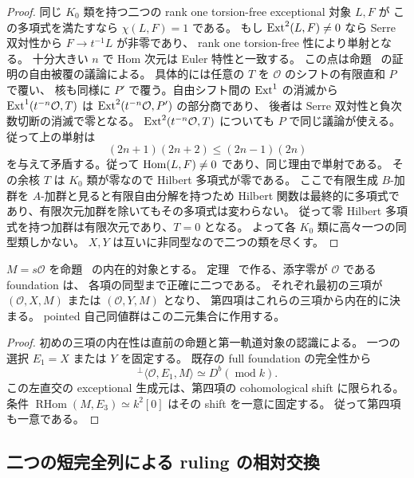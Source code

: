 \begin{proof}
同じ $K_0$ 類を持つ二つの rank one torsion-free exceptional 対象 $L,F$ が
この多項式を満たすなら $\chi(L,F)=1$ である。
もし $\operatorname{Ext}^2(L,F)\ne0$ なら Serre 双対性から $F\to t^{-1}L$ が非零であり、
rank one torsion-free 性により単射となる。
十分大きい $n$ で Hom 次元は Euler 特性と一致する。
この点は命題~\cite[\texttt{prop:first-orbit-object}]{QuadricIntrinsic2026} の証明の自由被覆の議論による。
具体的には任意の $T$ を $\mathcal O$ のシフトの有限直和 $P$ で覆い、
核も同様に $P'$ で覆う。自由シフト間の $\operatorname{Ext}^1$ の消滅から
$\operatorname{Ext}^1(t^{-n}\mathcal O,T)$ は $\operatorname{Ext}^2(t^{-n}\mathcal O,P')$ の部分商であり、
後者は Serre 双対性と負次数切断の消滅で零となる。
$\operatorname{Ext}^2(t^{-n}\mathcal O,T)$ についても $P$ で同じ議論が使える。
従って上の単射は
\[
 (2n+1)(2n+2)\le(2n-1)(2n)
\]
を与えて矛盾する。従って $\operatorname{Hom}(L,F)\ne0$ であり、同じ理由で単射である。
その余核 $T$ は $K_0$ 類が零なので Hilbert 多項式が零である。
ここで有限生成 $B$-加群を $A$-加群と見ると有限自由分解を持つため
Hilbert 関数は最終的に多項式であり、有限次元加群を除いてもその多項式は変わらない。
従って零 Hilbert 多項式を持つ加群は有限次元であり、$T=0$ となる。
よって各 $K_0$ 類に高々一つの同型類しかない。
$X,Y$ は互いに非同型なので二つの類を尽くす。
\end{proof}

\begin{corollary}
\label{cor:two-intrinsic-foundations}
$M=s\mathcal O$ を命題~\cite[\texttt{prop:first-orbit-object}]{QuadricIntrinsic2026} の内在的対象とする。
定理~\cite[\texttt{thm:normal-helix}]{QuadricIntrinsic2026} で作る、添字零が $\mathcal O$ である foundation は、
各項の同型まで正確に二つである。
それぞれ最初の三項が $(\mathcal O,X,M)$ または $(\mathcal O,Y,M)$ となり、
第四項はこれらの三項から内在的に決まる。
pointed 自己同値群はこの二元集合に作用する。
\end{corollary}

\begin{proof}
初めの三項の内在性は直前の命題と第一軌道対象の認識による。
一つの選択 $E_1=X$ または $Y$ を固定する。
既存の full foundation の完全性から
\[
 {}^{\perp}\langle\mathcal O,E_1,M\rangle\simeq D^b(\operatorname{mod}k).
\]
この左直交の exceptional 生成元は、第四項の cohomological shift に限られる。
条件 $\operatorname{RHom}(M,E_3)\simeq k^2[0]$ はその shift を一意に固定する。
従って第四項も一意である。
\end{proof}

\subsection{二つの短完全列による ruling の相対交換}
\label{subsec:foundation-ruling-involution}

